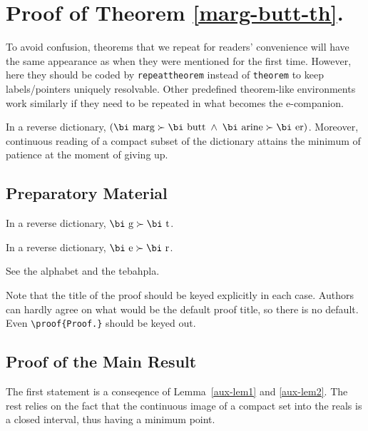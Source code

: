 \documentclass[opre,nonblindrev]{informs3} %
\begin{document}
\section{Proof of Theorem \ref{marg-butt-th}.}

To avoid confusion, theorems that we repeat for readers' convenience
will have the same appearance as when they were mentioned for the first
time. However, here they should be coded by \verb+repeattheorem+ instead
of \verb+theorem+ to keep labels/pointers uniquely resolvable. Other predefined theorem-like
environments work similarly if they need to be repeated in what becomes the \mbox{e-companion.}


\begin{repeattheorem}[Theorem 1.]
In a reverse dictionary, $(\mbox{\bi marg}\succ\mbox{\bi butt\/}\; \land\;
\mbox{\bi arine}\succ\mbox{\bi er})$.
Moreover, continuous reading of a compact subset of the dictionary
attains the minimum of patience at the moment of giving up.
\end{repeattheorem}

\subsection{Preparatory Material}

\begin{lemma}
\label{aux-lem1}
In a reverse dictionary, $\mbox{\bi g}\succ\mbox{\bi t\/}$.
\end{lemma}

\begin{lemma}
\label{aux-lem2}
In a reverse dictionary, $\mbox{\bi e}\succ\mbox{\bi r\/}$.
\end{lemma}

 See the alphabet and the tebahpla.\Halmos
\endproof

\begin{remark}
Note that the title of the proof should be keyed
explicitly in each case. Authors can hardly agree on what would be the
default proof title, so there is no default. Even \verb+\proof{Proof.}+ should be keyed out.
\end{remark}


\subsection{Proof of the Main Result}

 The first statement is a conseqence of
Lemma~\ref{aux-lem1} and \ref{aux-lem2}. The rest relies on the fact that the continuous
image of a compact set into the reals is a closed interval, thus having
a minimum point.\Halmos
\endproof
\end{document}
